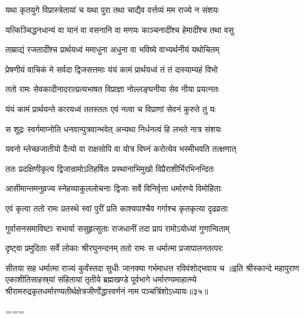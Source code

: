 \twolineshloka
{यथा कृतयुगे विप्रास्त्रेतायां च यथा पुरा}
{तथा चाद्यैव वर्त्तव्यं मम राज्ये न संशयः}%

\twolineshloka
{यत्किञ्चिद्धनधान्यं वा यानं वा वसनानि वा}
{मणयः काञ्चनादींश्च हेमादींश्च तथा वसु}%

\twolineshloka
{ताम्राद्यं रजतादींश्च प्रार्थयध्वं ममाधुना}
{अधुना वा भविष्ये वाभ्यर्थनीयं यथोचितम्}%

\twolineshloka
{प्रेषणीयं वाचिकं मे सर्वदा द्विजसत्तमाः}
{यंयं कामं प्रार्थयध्वं तं तं दास्याम्यहं विभो}%

\twolineshloka
{ततो रामः सेवकादीनादरात्प्रत्यभाषत}
{विप्राज्ञा नोल्लङ्घनीया सेव नीया प्रयत्नतः}%

\twolineshloka
{यंयं कामं प्रार्थयन्ते कारयध्वं ततस्ततः}
{एवं नत्वा च विप्राणां सेवनं कुरुते तु यः}%

\twolineshloka
{स शूद्रः स्वर्गमाप्नोति धनवान्पुत्रवान्भवेत्}
{अन्यथा निर्धनत्वं हि लभते नात्र संशयः}%

\twolineshloka
{यवनो म्लेच्छजातीयो दैत्यो वा राक्षसोपि वा}
{योत्र विघ्नं करोत्येव भस्मीभवति तत्क्षणात्}%


\twolineshloka
{ततः प्रदक्षिणीकृत्य द्विजान्रामोऽतिहर्षितः}
{प्रस्थानाभिमुखो विप्रैराशीर्भिरभिनन्दितः}%

\twolineshloka
{आसीमान्तमनुव्रज्य स्नेहव्याकुललोचनाः}
{द्विजाः सर्वे विनिर्वृत्ता धर्मारण्ये विमोहिताः}%

\twolineshloka
{एवं कृत्वा ततो रामः प्रतस्थे स्वां पुरीं प्रति}
{काश्यपाश्चैव गर्गाश्च कृतकृत्या दृढव्रताः}%

\twolineshloka
{गुर्वासनसमाविष्टाः सभार्या ससुहृत्सुताः}
{राजधानीं तदा प्राप रामोऽयोध्यां गुणान्विताम्}%

\twolineshloka
{दृष्ट्वा प्रमुदिताः सर्वे लोकाः श्रीरघुनन्दनम्}
{ततो रामः स धर्मात्मा प्रजापालनतत्परः}%

\twolineshloka
{सीतया सह धर्मात्मा राज्यं कुर्वंस्तदा सुधीः}
{जानक्या गर्भमाधत्त रविवंशोद्भवाय च}%
॥इति श्रीस्कान्दे महापुराण एकाशीतिसाहस्र्यां संहितायां तृतीये ब्रह्मखण्डे पूर्वभागे धर्मारण्यमाहात्म्ये श्रीरामरुद्रकृतधर्मारण्यतीर्थक्षेत्रजीर्णोद्धारवर्णनं नाम पञ्चत्रिंशोऽध्यायः॥३५॥

===


\vakta{}
\shrota{}
\tags{}
\notes{}

